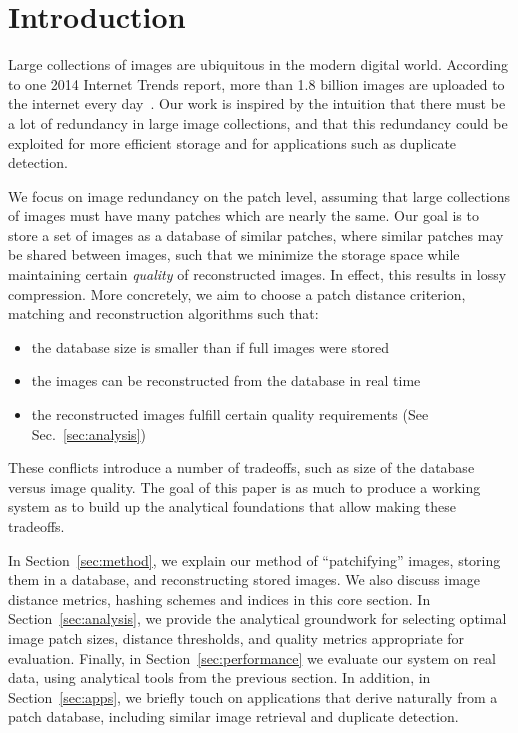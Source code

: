 \section{Introduction}

Large collections of images are ubiquitous in the modern digital world.
According to one 2014 Internet Trends report,
more than 1.8 billion images are uploaded to the internet every day~\cite{meeker2014internet}.
Our work is inspired by the intuition that there must be a lot of redundancy
in large image collections, and that this redundancy could
be exploited for more efficient storage and for applications such as duplicate detection.

We focus on image redundancy on the patch level, assuming that large collections
of images must have many patches which are nearly the same.
Our goal is to store a set of images as a database of
similar patches, where similar patches may be shared between images,
 such that we minimize the storage space while maintaining certain \emph{quality}
of reconstructed images. In effect, this results in lossy compression. More concretely,
we aim to choose a patch distance criterion, matching and reconstruction algorithms such
that:
\begin{itemize}
\item the database size is smaller than if full images were stored
\item the images can be reconstructed from the database in real time
\item the reconstructed images fulfill certain quality requirements (See Sec.~\ref{sec:analysis})
\end{itemize}
These conflicts introduce a number of tradeoffs, such as size of
the database versus image quality.
The goal of this paper is as much to produce a working system as to
build up the analytical foundations that allow making these tradeoffs.

In Section~\ref{sec:method}, we explain our method of ``patchifying'' images,
storing them in a database, and reconstructing stored images. We also
discuss image distance metrics, hashing schemes and indices in this core section.
In Section~\ref{sec:analysis}, we provide the analytical groundwork for
selecting optimal image patch sizes, distance thresholds, and quality metrics
appropriate for evaluation. Finally, in Section~\ref{sec:performance}
we evaluate our system on real data, using analytical tools from the previous section.
In addition, in Section~\ref{sec:apps}, we briefly touch on applications that derive naturally
from a patch database, including similar image retrieval and duplicate detection.

